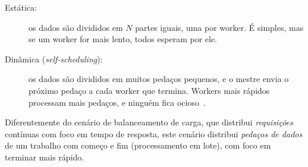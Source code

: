 \begin{description}
  \item[Estática:] os dados são divididos em $N$ partes iguais, uma por
    worker. É simples, mas se um worker for mais lento, todos esperam por
    ele.
  \item[Dinâmica (\emph{self-scheduling}):] os dados são divididos em
    muitos pedaços pequenos, e o mestre envia o próximo pedaço a cada
    worker que termina. Workers mais rápidos processam mais pedaços, e
    ninguém fica ocioso~\cite{calvinmpi}.
\end{description}

Diferentemente do cenário de balanceamento de carga, que distribui
\emph{requisições} contínuas com foco em tempo de resposta, este cenário
distribui \emph{pedaços de dados} de um trabalho com começo e fim
(processamento em lote), com foco em terminar mais rápido.
